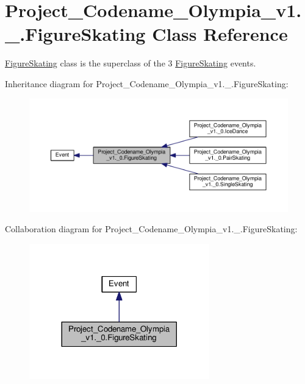 \hypertarget{classProject__Codename__Olympia__v1_1_1__0_1_1FigureSkating}{}\section{Project\+\_\+\+Codename\+\_\+\+Olympia\+\_\+v1.\+\_.\+Figure\+Skating Class Reference}
\label{classProject__Codename__Olympia__v1_1_1__0_1_1FigureSkating}


\hyperlink{classProject__Codename__Olympia__v1_1_1__0_1_1FigureSkating}{Figure\+Skating} class is the superclass of the 3 \hyperlink{classProject__Codename__Olympia__v1_1_1__0_1_1FigureSkating}{Figure\+Skating} events.  




Inheritance diagram for Project\+\_\+\+Codename\+\_\+\+Olympia\+\_\+v1.\+\_.\+Figure\+Skating\+:
\nopagebreak
\begin{figure}[H]
\begin{center}
\leavevmode
\includegraphics[width=350pt]{classProject__Codename__Olympia__v1_1_1__0_1_1FigureSkating__inherit__graph}
\end{center}
\end{figure}


Collaboration diagram for Project\+\_\+\+Codename\+\_\+\+Olympia\+\_\+v1.\+\_.\+Figure\+Skating\+:
\nopagebreak
\begin{figure}[H]
\begin{center}
\leavevmode
\includegraphics[width=221pt]{classProject__Codename__Olympia__v1_1_1__0_1_1FigureSkating__coll__graph}
\end{center}
\end{figure}
